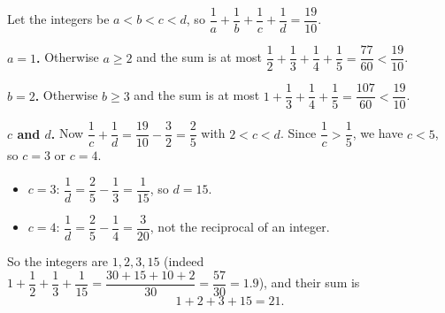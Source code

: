 Let the integers be $a<b<c<d$, so $\dfrac{1}{a}+\dfrac{1}{b}+\dfrac{1}{c}+\dfrac{1}{d}=\dfrac{19}{10}$.

\textbf{$a=1$.} Otherwise $a\ge2$ and the sum is at most $\dfrac{1}{2}+\dfrac{1}{3}+\dfrac{1}{4}+\dfrac{1}{5}=\dfrac{77}{60}<\dfrac{19}{10}$.

\textbf{$b=2$.} Otherwise $b\ge3$ and the sum is at most $1+\dfrac{1}{3}+\dfrac{1}{4}+\dfrac{1}{5}=\dfrac{107}{60}<\dfrac{19}{10}$.

\textbf{$c$ and $d$.} Now $\dfrac{1}{c}+\dfrac{1}{d}=\dfrac{19}{10}-\dfrac{3}{2}=\dfrac{2}{5}$ with $2<c<d$. Since $\dfrac{1}{c}>\dfrac{1}{5}$, we have $c<5$, so $c=3$ or $c=4$.
\begin{itemize}
\item $c=3$: $\dfrac{1}{d}=\dfrac{2}{5}-\dfrac{1}{3}=\dfrac{1}{15}$, so $d=15$.
\item $c=4$: $\dfrac{1}{d}=\dfrac{2}{5}-\dfrac{1}{4}=\dfrac{3}{20}$, not the reciprocal of an integer.
\end{itemize}
So the integers are $1,2,3,15$ (indeed $1+\dfrac{1}{2}+\dfrac{1}{3}+\dfrac{1}{15}=\dfrac{30+15+10+2}{30}=\dfrac{57}{30}=1.9$), and their sum is
\[
1+2+3+15=\boxed{21}.
\]
